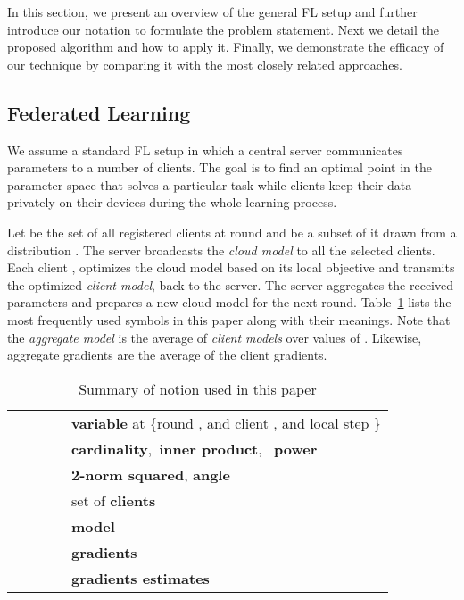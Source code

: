 \documentclass[runningheads]{llncs}
\def\tableref#1{Table~\ref{#1}}
\begin{document}
In this section, we present an overview of the general FL setup and further introduce our notation to formulate the problem statement. Next we detail the proposed algorithm and how to apply it. Finally, we demonstrate the efficacy of our technique by comparing it with the most closely related approaches.


\subsection{Federated Learning}
We assume a standard FL setup in which a central server communicates parameters to a number of clients.
The goal is to find an optimal point in the parameter space that solves a particular task while clients keep their data privately on their devices during the whole learning process. 

Let  be the set of all registered clients at round  and  be a subset of it drawn from a distribution .
The server broadcasts the \emph{cloud model}  to all the selected clients.
Each client , optimizes the cloud model based on its local objective and transmits the optimized \emph{client model},  back to the server.
The server aggregates the received parameters and prepares a new cloud model for the next round. 
\tableref{tb:notation} lists the most frequently used symbols in this paper along with their meanings. Note that the \emph{aggregate model} is the average of \emph{client models} over values of .
Likewise, aggregate gradients are the average of the client gradients.


\begin{table}
\caption{Summary of notion used in this paper}
\label{tb:notation}
    \begin{center}
\begin{tabular}{cl}
        \toprule
         & \textbf{variable}  at \{round , and {client} , and {local step} \} \\
         \ \ \ \ \ \ &  \textbf{cardinality},\  \textbf{inner product}, \ \textbf{power}\\
         & \textbf{2-norm squared}, \textbf{angle} \\
         & set of  \textbf{clients}\\
         &  \textbf{model}\\
         &  \textbf{gradients}\\
         &  \textbf{gradients estimates}\\
        \bottomrule
    \end{tabular}
\end{center}
\end{table} 
\end{document}
